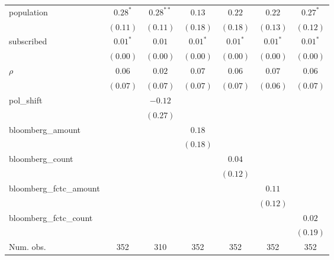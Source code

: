 \begin{table}[!h]
\begin{center}
\begin{tabular}{l c c c c c c }
population              & $0.28^{*}$   & $0.28^{**}$  & $0.13$       & $0.22$       & $0.22$       & $0.27^{*}$   \\
                        & $(0.11)$     & $(0.11)$     & $(0.18)$     & $(0.18)$     & $(0.13)$     & $(0.12)$     \\
subscribed              & $0.01^{*}$   & $0.01$       & $0.01^{*}$   & $0.01^{*}$   & $0.01^{*}$   & $0.01^{*}$   \\
                        & $(0.00)$     & $(0.00)$     & $(0.00)$     & $(0.00)$     & $(0.00)$     & $(0.00)$     \\
$\rho$                  & $0.06$       & $0.02$       & $0.07$       & $0.06$       & $0.07$       & $0.06$       \\
                        & $(0.07)$     & $(0.07)$     & $(0.07)$     & $(0.07)$     & $(0.06)$     & $(0.07)$     \\
pol\_shift              &              & $-0.12$      &              &              &              &              \\
                        &              & $(0.27)$     &              &              &              &              \\
bloomberg\_amount       &              &              & $0.18$       &              &              &              \\
                        &              &              & $(0.18)$     &              &              &              \\
bloomberg\_count        &              &              &              & $0.04$       &              &              \\
                        &              &              &              & $(0.12)$     &              &              \\
bloomberg\_fctc\_amount &              &              &              &              & $0.11$       &              \\
                        &              &              &              &              & $(0.12)$     &              \\
bloomberg\_fctc\_count  &              &              &              &              &              & $0.02$       \\
                        &              &              &              &              &              & $(0.19)$     \\
\midrule
Num. obs.               & 352          & 310          & 352          & 352          & 352          & 352          \\

\end{tabular}
\end{center}
\end{table}
